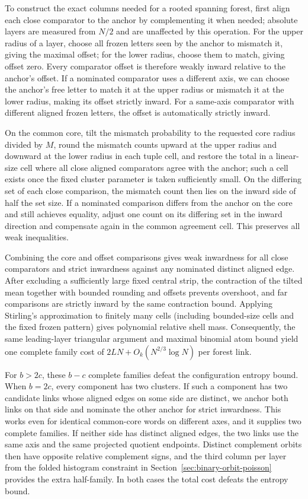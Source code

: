 To construct the exact columns needed for a rooted spanning forest, first align each close comparator to the anchor by complementing it when needed; absolute layers are measured from \(N/2\) and are unaffected by this operation. For the upper radius of a layer, choose all frozen letters seen by the anchor to mismatch it, giving the maximal offset; for the lower radius, choose them to match, giving offset zero. Every comparator offset is therefore weakly inward relative to the anchor's offset. If a nominated comparator uses a different axis, we can choose the anchor's free letter to match it at the upper radius or mismatch it at the lower radius, making its offset strictly inward. For a same-axis comparator with different aligned frozen letters, the offset is automatically strictly inward.

On the common core, tilt the mismatch probability to the requested core radius divided by \(M\), round the mismatch counts upward at the upper radius and downward at the lower radius in each tuple cell, and restore the total in a linear-size cell where all close aligned comparators agree with the anchor; such a cell exists once the fixed cluster parameter is taken sufficiently small. On the differing set of each close comparison, the mismatch count then lies on the inward side of half the set size. If a nominated comparison differs from the anchor on the core and still achieves equality, adjust one count on its differing set in the inward direction and compensate again in the common agreement cell. This preserves all weak inequalities.

Combining the core and offset comparisons gives weak inwardness for all close comparators and strict inwardness against any nominated distinct aligned edge. After excluding a sufficiently large fixed central strip, the contraction of the tilted mean together with bounded rounding and offsets prevents overshoot, and far comparisons are strictly inward by the same contraction bound. Applying Stirling's approximation to finitely many cells (including bounded-size cells and the fixed frozen pattern) gives polynomial relative shell mass. Consequently, the same leading-layer triangular argument and maximal binomial atom bound yield one complete family cost of \(2LN+O_k(N^{2/3}\log N)\) per forest link.

For \(b>2c\), these \(b-c\) complete families defeat the configuration entropy bound. When \(b=2c\), every component has two clusters. If such a component has two candidate links whose aligned edges on some side are distinct, we anchor both links on that side and nominate the other anchor for strict inwardness. This works even for identical common-core words on different axes, and it supplies two complete families. If neither side has distinct aligned edges, the two links use the same axis and the same projected quotient endpoints. Distinct complement orbits then have opposite relative complement signs, and the third column per layer from the folded histogram constraint in Section~\ref{sec:binary-orbit-poisson} provides the extra half-family. In both cases the total cost defeats the entropy bound.

